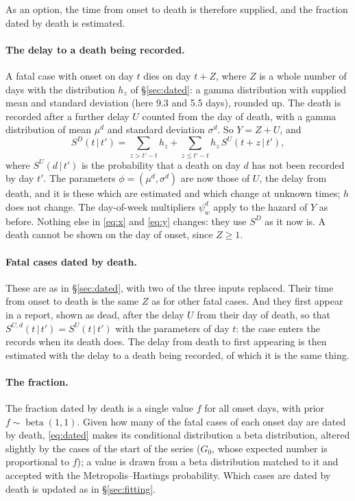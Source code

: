 \documentclass[11pt,a4paper]{article}
\newcommand{\given}{\,|\,}
\newcommand{\betad}{\operatorname{beta}}
\begin{document}
As an option, the time from onset to death is therefore supplied, and the
fraction dated by death is estimated.

\paragraph{The delay to a death being recorded.} A fatal case with onset on
day $t$ dies on day $t+Z$, where $Z$ is a whole number of days with the
distribution $h_z$ of \S\ref{sec:dated}: a gamma distribution with supplied
mean and standard deviation (here 9.3 and 5.5 days), rounded up. The death
is recorded after a further delay $U$ counted from the day of death, with a
gamma distribution of mean $\mu^{d}$ and standard deviation $\sigma^{d}$.
So $Y=Z+U$, and
\[
S^{D}(t\given t')=\sum_{z>t'-t}h_z+\sum_{z\le t'-t}h_z\,S^{U}(t+z\given t'),
\]
where $S^{U}(d\given t')$ is the probability that a death on day $d$ has not
been recorded by day $t'$. The parameters $\phi=(\mu^{d},\sigma^{d})$ are
now those of $U$, the delay from death, and it is these which are estimated
and which change at unknown times; $h$ does not change. The day-of-week
multipliers $\psi^{d}_w$ apply to the hazard of $Y$ as before. Nothing else
in \eqref{eq:x} and \eqref{eq:y} changes: they use $S^{D}$ as it now is. A
death cannot be shown on the day of onset, since $Z\ge1$.

\paragraph{Fatal cases dated by death.} These are as in \S\ref{sec:dated},
with two of the three inputs replaced. Their time from onset to death is the
same $Z$ as for other fatal cases. And they first appear in a report, shown
as dead, after the delay $U$ from their day of death, so that
$S^{C,d}(t\given t')=S^{U}(t\given t')$ with the parameters of day $t$: the
case enters the records when its death does. The delay from death to first
appearing is then estimated with the delay to a death being recorded, of
which it is the same thing.

\paragraph{The fraction.} The fraction dated by death is a single value $f$
for all onset days, with prior $f\sim\betad(1,1)$. Given how many of the
fatal cases of each onset day are dated by death, \eqref{eq:dated} makes its
conditional distribution a beta distribution, altered slightly by the cases
of the start of the series ($G_0$, whose expected number is proportional to
$f$); a value is drawn from a beta distribution matched to it and accepted
with the Metropolis--Hastings probability. Which cases are dated by death is
updated as in \S\ref{sec:fitting}.
\end{document}
